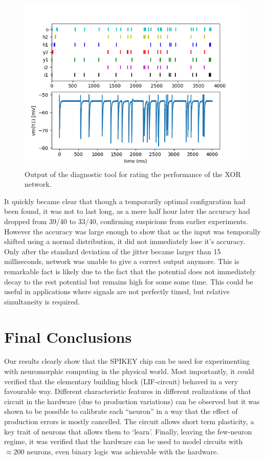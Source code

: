 \documentclass[10pt,a4paper]{article}
\begin{document}
\begin{figure}
    \centering
    \includegraphics[width=\textwidth]{figures/XOR-output.png}
    \caption{Output of the diagnostic tool for rating the performance of the XOR network.}
    \label{fig:XOR-output}
\end{figure}

It quickly became clear that though a temporarily optimal configuration had been
found, it was not to last long, as a mere half hour later the accuracy had
dropped from 39/40 to 33/40, confirming suspicions from earlier experiments.
However the accuracy was large enough to show that as the input was temporally
shifted using a normal distribution, it did not immediately lose it's accuracy.
Only after the standard deviation of the jitter became larger than 15
milliseconds, network was unable to give a correct output anymore. This is
remarkable fact is likely due to the fact that the potential does not
immediately decay to the rest potential but remains high for some some time.
This could be useful in applications where signals are not perfectly timed, but
relative simultaneity is required.


\section{Final Conclusions}
Our results clearly show that the SPIKEY chip can be used for experimenting with
neuromorphic computing in the physical world. Most importantly, it could
verified that the elementary building block (LIF-circuit) behaved in a very
favourable way. Different characteristic features in different realizations of
that circuit in the hardware (due to production variations) can be observed but it
was shown to be possible to calibrate each  ``neuron'' in a way that the effect
of production errors is mostly cancelled. The circuit allows short term
plasticity,  a key trait of neurons that allows them to `learn'.  Finally,
leaving the few-neuron regime, it was verified that the hardware can be used to
model circuits with $\approx 200$ neurons, even binary logic was achievable with
the hardware.
\end{document}
